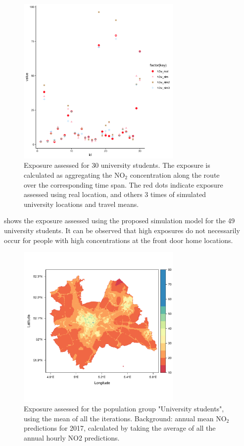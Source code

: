 \documentclass[]{article}
\begin{document}
\begin{figure}[h]
    \centering
    \includegraphics[width=8cm]{figure/sims.png}
    \caption{Exposure assessed for 30 university students. The exposure is calculated as aggregating the NO$_2$ concentration along the route over the corresponding time span. The red dots indicate exposure assessed using real location, and others 3 times of simulated university locations and travel means.}
    \label{sims}
\end{figure}


 shows the exposure assessed using the proposed simulation model for the 49 university students. It can be observed that high exposures do not necessarily occur for people with high concentrations at the front door home locations.

\begin{figure}[h]
    \centering
    \includegraphics[width=8cm]{figure/utschoolmean2.pdf}
    \caption{Exposure assessed for the population group "University students", using the mean of all the iterations.  Background: annual mean NO$_2$ predictions for 2017, calculated by taking the average of all the annual hourly NO2 predictions.}
    \label{expmap}
\end{figure}
\end{document}
